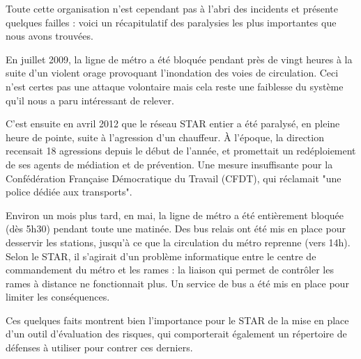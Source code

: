             Toute cette organisation n'est cependant pas à l'abri des incidents et présente quelques failles : voici un récapitulatif des paralysies les plus importantes que nous avons trouvées.

            En juillet 2009, la ligne de métro a été bloquée pendant près de vingt heures à la suite d'un violent orage provoquant l'inondation des voies de circulation. Ceci n'est certes pas une attaque volontaire mais cela reste une faiblesse du système qu'il nous a paru intéressant de relever. 

            C'est ensuite en avril 2012 que le réseau STAR entier a été paralysé, en pleine heure de pointe, suite à l'agression d'un chauffeur. À l'époque, la direction recensait 18 agressions depuis le début de l'année, et promettait un redéploiement de ses agents de médiation et de prévention. Une mesure insuffisante pour la Confédération Française Démocratique du Travail (CFDT), qui réclamait "une police dédiée aux transports".

            Environ un mois plus tard, en mai, la ligne de métro a été entièrement bloquée (dès 5h30) pendant toute une matinée. Des bus relais ont été mis en place pour desservir les stations, jusqu'à ce que la circulation du métro reprenne (vers 14h). Selon le STAR, il s’agirait d’un problème informatique entre le centre de commandement du métro et les rames : la liaison qui permet de contrôler les rames à distance ne fonctionnait plus. Un service de bus a été mis en place pour limiter les conséquences.

            Ces quelques faits montrent bien l'importance pour le STAR de la mise en place d'un outil d'évaluation des risques, qui comporterait également un répertoire de défenses à utiliser pour contrer ces derniers.